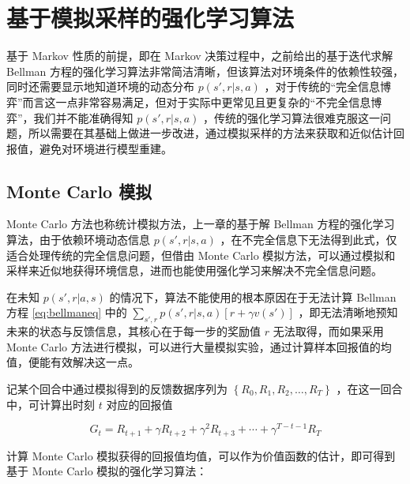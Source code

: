
\chapter{基于模拟采样的强化学习算法}

基于 Markov 性质的前提，即在 Markov 决策过程中，之前给出的基于迭代求解 Bellman 方程的强化学习算法非常简洁清晰，但该算法对环境条件的依赖性较强，同时还需要显示地知道环境的动态分布 $p(s',r|s,a)$ ，对于传统的“完全信息博弈”而言这一点非常容易满足，但对于实际中更常见且更复杂的“不完全信息博弈”，我们并不能准确得知 $p(s',r|s,a)$ ，传统的强化学习算法很难克服这一问题\cite{sutton2018reinforcement}，所以需要在其基础上做进一步改进，通过模拟采样的方法来获取和近似估计回报值，避免对环境进行模型重建。

\section{Monte Carlo 模拟}

Monte Carlo 方法\cite{goodfellow2016deep}\cite{robert2013monte}也称统计模拟方法，上一章的基于解 Bellman 方程的强化学习算法，由于依赖环境动态信息 $p(s',r|s,a)$ ，在不完全信息下无法得到此式，仅适合处理传统的完全信息问题，但借由 Monte Carlo 模拟方法，可以通过模拟和采样来近似地获得环境信息，进而也能使用强化学习来解决不完全信息问题。

在未知 $p(s',r|a,s)$ 的情况下，算法不能使用的根本原因在于无法计算 Bellman 方程 \ref{eq:bellmaneq} 中的 $\sum_{s',r}p(s',r|s,a)[r+\gamma v(s')]$ ，即无法清晰地预知未来的状态与反馈信息，其核心在于每一步的奖励值 $r$ 无法取得，而如果采用 Monte Carlo 方法进行模拟，可以进行大量模拟实验，通过计算样本回报值的均值，便能有效解决这一点。

记某个回合中通过模拟得到的反馈数据序列为 $\left\{R_0, R_1, R_2, \ldots, R_T\right\}$ ，在这一回合中，可计算出时刻 $t$ 对应的回报值

\begin{equation}
    G_t = R_{t+1} + \gamma R_{t+2} + \gamma^2 R_{t+3} + \cdots + \gamma^{T-t-1} R_T
\end{equation}

计算 Monte Carlo 模拟获得的回报值均值，可以作为价值函数的估计，即可得到基于 Monte Carlo 模拟的强化学习算法：

